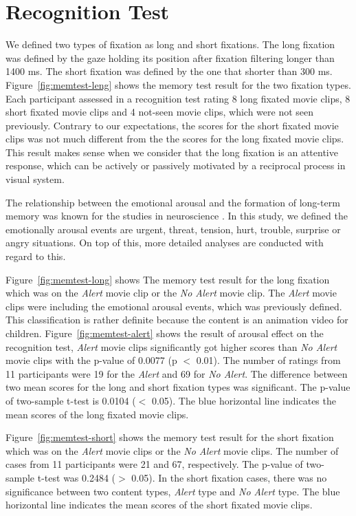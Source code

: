 \documentclass[oneside,master]{snueethesis}
\begin{document}
\section{Recognition Test}

We defined two types of fixation as long and short fixations. The long fixation was defined by the gaze holding its position after fixation filtering longer than 1400 ms. The short fixation was defined by the one that shorter than 300 ms. Figure~\ref{fig:memtest-leng} shows the memory test result for the two fixation types. Each participant assessed in a recognition test rating 8 long fixated movie clips, 8 short fixated movie clips and 4 not-seen movie clips, which were not seen previously. Contrary to our expectations, the scores for the short fixated movie clips was not much different from the the scores for the long fixated movie clips. This result makes sense when we consider that the long fixation is an attentive response, which can be actively or passively motivated by a reciprocal process in visual system.

The relationship between the emotional arousal and the formation of long-term memory was known for the studies in neuroscience \cite{Cahill1996amyg,Cahill1998baso}. In this study, we defined the emotionally arousal events are urgent, threat, tension, hurt, trouble, surprise or angry situations. On top of this, more detailed analyses are conducted with regard to this.

Figure~\ref{fig:memtest-long} shows The memory test result for the long fixation which was on the \textit{Alert} movie clip or the \textit{No Alert} movie clip. The \textit{Alert} movie clips were including the emotional arousal events, which was previously defined. This classification is rather definite because the content is an animation video for children. Figure~\ref{fig:memtest-alert} shows the result of arousal effect on the recognition test, \textit{Alert} movie clips significantly got higher scores than \textit{No Alert} movie clips with the p-value of 0.0077 (p $<$ 0.01). The number of ratings from 11 participants were 19 for the \textit{Alert} and 69 for \textit{No Alert}. The difference between two mean scores for the long and short fixation types was significant. The p-value of two-sample t-test is 0.0104 ($<$ 0.05). The blue horizontal line indicates the mean scores of the long fixated movie clips.

Figure~\ref{fig:memtest-short} shows the memory test result for the short fixation which was on the \textit{Alert} movie clips or the \textit{No Alert} movie clips. The number of cases from 11 participants were 21 and 67, respectively. The p-value of two-sample t-test was 0.2484 ($>$ 0.05). In the short fixation cases, there was no significance between two content types, \textit{Alert} type and \textit{No Alert} type. The blue horizontal line indicates the mean scores of the short fixated movie clips.
\end{document}
